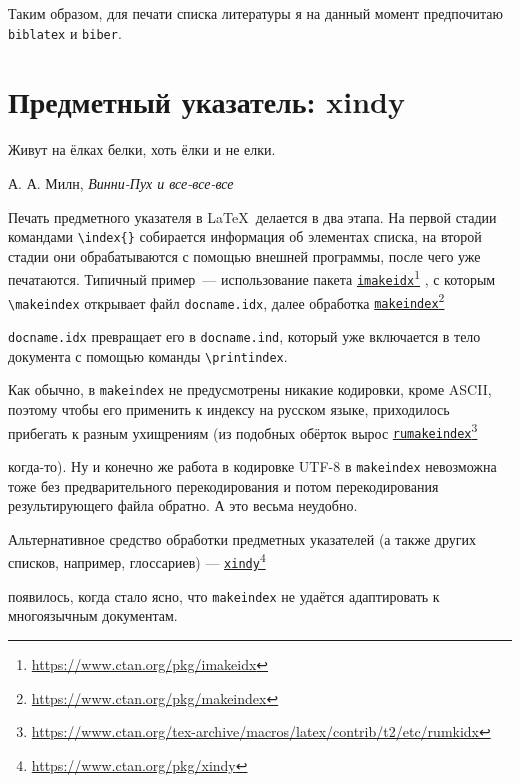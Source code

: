 \documentclass[a4paper,12pt]{article}
\newcommand\foothref[2]{%
  \href{#1}{#2}\footnote{\url{#1}}%
}
\newcommand\package[1]{\texttt{#1}}
\newcommand\exe[1]{\texttt{#1}}
\newcommand\file[1]{\texttt{#1}}
\begin{document}
Таким образом, для печати списка литературы я на данный момент предпочитаю
\package{biblatex} и \exe{biber}.

\section{Предметный указатель: xindy}
\epigraph{Живут на ёлках белки, хоть ёлки и не елки.}{А. А. Милн, \emph{Винни-Пух и все-все-все}}
Печать предметного указателя в \LaTeX\ делается в два этапа. На первой стадии
командами \verb|\index{}| собирается информация об элементах списка,
на второй стадии они обрабатываются с помощью внешней программы, после
чего уже печатаются. Типичный пример~--- использование пакета
\foothref{https://www.ctan.org/pkg/imakeidx}{\package{imakeidx}},
с которым \verb|\makeindex| открывает файл \file{docname.idx}, далее
обработка \foothref{https://www.ctan.org/pkg/makeindex}{\package{makeindex}}
\file{docname.idx} превращает его в \file{docname.ind},
который уже включается в тело документа с помощью команды \verb|\printindex|.

Как обычно, в \exe{makeindex} не предусмотрены никакие кодировки, кроме ASCII,
поэтому чтобы его применить к индексу на русском языке, приходилось прибегать
к разным ухищрениям (из подобных обёрток вырос
\foothref{https://www.ctan.org/tex-archive/macros/latex/contrib/t2/etc/rumkidx}{\exe{rumakeindex}}
когда-то). Ну и конечно
же работа в кодировке UTF-8 в \exe{makeindex} невозможна тоже без предварительного
перекодирования и потом перекодирования результирующего файла обратно. А это
весьма неудобно.

Альтернативное средство обработки предметных указателей (а также других списков,
например, глоссариев) --- \foothref{https://www.ctan.org/pkg/xindy}{\exe{xindy}}
появилось, когда стало ясно, что
\exe{makeindex} не удаётся адаптировать к многоязычным документам.
\end{document}
